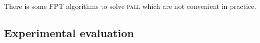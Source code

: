 \documentclass[10pt, conference, letterpaper]{IEEEtran}
\newcommand{\todo}[1]{{\color{red} TODO: {#1}}}
\newcommand\pall{\textsc{pall}\xspace}
\begin{document}
%
%
%
 There is some FPT algorithms to solve \pall which are not convenient in practice.
    \subsection{Experimental evaluation}
    \label{sec:resultsPALL}
    
\end{document}
